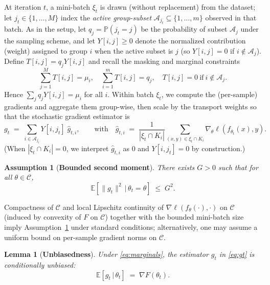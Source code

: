 \documentclass[9pt]{extarticle}
\newtheorem{lemma}{Lemma}
\newtheorem{assumption}{Assumption}
\theoremstyle{definition}
\renewcommand{\paragraph}[1]{\par\medskip\noindent{\bf #1}\hspace{0.5em}\ignorespaces}
\begin{document}
\paragraph{Sampling and weighting.}
At iteration $t$, a mini-batch $\xi_t$ is drawn (without replacement) from the dataset; let $j_t\in\{1,\dots,M\}$ index the \emph{active group-subset} $\mathcal{A}_{j_t}\subseteq\{1,\dots,m\}$ observed in that batch. As in the setup, let $q_j=\mathbb{P}(j_t=j)$ be the probability of subset $\mathcal{A}_j$ under the sampling scheme, and let $Y[i,j]\ge 0$ denote the normalized contribution (weight) assigned to group $i$ when the active subset is $j$ (so $Y[i,j]=0$ if $i\notin\mathcal{A}_j$). Define $T[i,j]=q_j Y[i,j]$ and recall the masking and marginal constraints
\begin{equation}\label{eq:marginals}
\sum_{j=1}^M T[i,j]=\mu_i,\quad \sum_{i=1}^m T[i,j]=q_j,\quad T[i,j]=0 \ \text{if}\ i\notin\mathcal{A}_j.
\end{equation}
Hence $\sum_{j} q_j Y[i,j]=\mu_i$ for all $i$.
Within batch $\xi_t$, we compute the (per-sample) gradients and aggregate them group-wise, then scale by the transport weights so that the stochastic gradient estimator is
\begin{equation}\label{eq:gt}
g_t \;=\; \sum_{i\in\mathcal{A}_{j_t}} Y[i,j_t]\;\widehat{g}_{t,i},
\qquad
\text{with}\quad
\widehat{g}_{t,i} \;=\; \frac{1}{|\xi_t\cap K_i|}\sum_{(x,y)\in \xi_t\cap K_i} \nabla_\theta \ell\!\left(f_{\theta_t}(x),y\right).
\end{equation}
(When $|\xi_t\cap K_i|=0$, we interpret $\widehat{g}_{t,i}$ as $0$ and $Y[i,j_t]=0$ by construction.)
\begin{assumption}[\textbf{Bounded second moment}]\label{assump:gradient_bound}
There exists $G>0$ such that for all $\theta\in\mathcal{C}$,
\[
\mathbb{E}\!\left[\|g_t\|^2 \,\big|\, \theta_t=\theta\right] \;\le\; G^2.
\]
\end{assumption}
\noindent
Compactness of $\mathcal{C}$ and local Lipschitz continuity of $\nabla \ell\!\left(f_\theta(\cdot),\cdot\right)$ on $\mathcal{C}$ (induced by convexity of $F$ on $\mathcal{C}$) together with the bounded mini-batch size imply Assumption~\ref{assump:gradient_bound} under standard conditions; alternatively, one may assume a uniform bound on per-sample gradient norms on $\mathcal{C}$.
\begin{lemma}[\textbf{Unbiasedness}]\label{lem:unbiased}
Under \eqref{eq:marginals}, the estimator $g_t$ in \eqref{eq:gt} is conditionally unbiased:
\[
\mathbb{E}\!\left[g_t \,\big|\, \theta_t\right] \;=\; \nabla F(\theta_t).
\]
\end{lemma}
\end{document}
